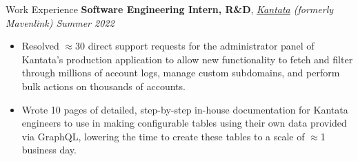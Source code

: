 \documentclass{resume}
\begin{document}
\begin{rSection}{Work Experience}
    {\bf Software Engineering Intern, R\&D}, {\em \href{https://www.kantata.com/}{Kantata} (formerly Mavenlink) \hfill Summer 2022}
    \vspace{-6pt}
    \begin{itemize}[nosep]
        \item Resolved $\approx$30 direct support requests for the administrator panel of Kantata's production application to allow new functionality to fetch and filter through millions of account logs, manage custom subdomains, and perform bulk actions on thousands of accounts.
        \item Wrote 10 pages of detailed, step-by-step in-house documentation for Kantata engineers to use in making configurable tables using their own data provided via GraphQL, lowering the time to create these tables to a scale of $\approx$1 business day.
    \end{itemize}
    
    
    

\end{rSection}
\end{document}
